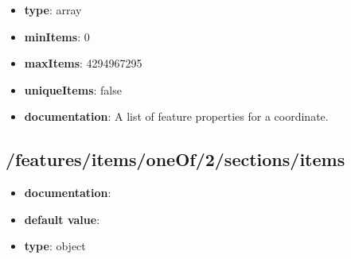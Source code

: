 \begin{itemize}\item {\bf type}: array
\item {\bf minItems}: 0
\item {\bf maxItems}: 4294967295
\item {\bf uniqueItems}: false
\item {\bf documentation}: A list of feature properties for a coordinate.
\end{itemize}\subsection{/features/items/oneOf/2/sections/items}
\begin{itemize}\item {\bf documentation}: 
\item {\bf default value}: 
\item {\bf type}: object
\end{itemize}
